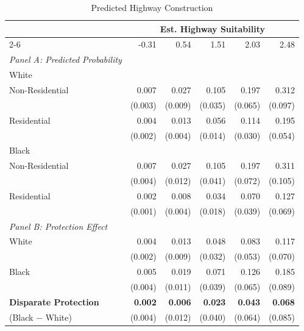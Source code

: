 \begin{table}[h]
\centering
\caption{Predicted Highway Construction }
\label{tab:predicted_outcomes/mblack_mean_pct}
\begin{threeparttable}
\begin{tabular*}{1\textwidth}{@{\extracolsep{\fill}}lr@{\hspace{1.2em}}r@{\hspace{1.2em}}r@{\hspace{1.2em}}r@{\hspace{1.2em}}r@{\hspace{1.2em}}}
\toprule
 & \multicolumn{5}{c}{Est. Highway Suitability} \\
\cmidrule(l){2-6}
 & -0.31 & 0.54 & 1.51 & 2.03 & 2.48 \\
\midrule
\textit{Panel A: Predicted Probability} & & & & & \\
\addlinespace[2pt]
White & & & & & \\
\quad Non-Residential & 0.007 & 0.027 & 0.105 & 0.197 & 0.312 \\
 & (0.003) & (0.009) & (0.035) & (0.065) & (0.097) \\[4pt]
\quad Residential & 0.004 & 0.013 & 0.056 & 0.114 & 0.195 \\
 & (0.002) & (0.004) & (0.014) & (0.030) & (0.054) \\[4pt]
Black & & & & & \\
\quad Non-Residential & 0.007 & 0.027 & 0.105 & 0.197 & 0.311 \\
 & (0.004) & (0.012) & (0.041) & (0.072) & (0.105) \\[4pt]
\quad Residential & 0.002 & 0.008 & 0.034 & 0.070 & 0.127 \\
 & (0.001) & (0.004) & (0.018) & (0.039) & (0.069) \\[4pt]
\midrule
\textit{Panel B: Protection Effect} & & & & & \\
\addlinespace[2pt]
White & 0.004 & 0.013 & 0.048 & 0.083 & 0.117\rlap{$^{*}$} \\
 & (0.002) & (0.009) & (0.032) & (0.053) & (0.070) \\[4pt]
Black & 0.005 & 0.019\rlap{$^{*}$} & 0.071\rlap{$^{*}$} & 0.126\rlap{$^{*}$} & 0.185\rlap{$^{**}$} \\
 & (0.004) & (0.011) & (0.039) & (0.065) & (0.089) \\[4pt]
\addlinespace[2pt]
\textbf{Disparate Protection} & \textbf{0.002} & \textbf{0.006} & \textbf{0.023} & \textbf{0.043} & \textbf{0.068} \\
(Black $-$ White) & (0.004) & (0.012) & (0.040) & (0.064) & (0.085) \\

\end{tabular*}
\end{threeparttable}
\end{table}
